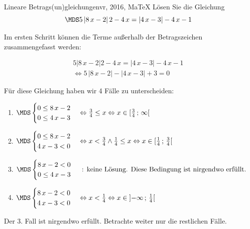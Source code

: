  \providecommand{\MoIl}[1][]{\mbox{}#1]\mathopen{}} 
 \providecommand{\MoIr}[1][]{#1[\mbox{}} 
 \providecommand{\MIntvlSep}{;} 
 \providecommand{\MElSetSep}{\, ; \, } 
 \begin{MAufgabe}{Lineare Betrags(un)gleichungen}{vr, 2016, MaTeX}
L\"osen Sie die Gleichung
$$
 \MDS 5\left| 8\, x - 2 \right|2 - 4\, x=  \left| 4\, x - 3 \right|  - 4\, x - 1
$$  

\ifLsg\MLoesung

Im ersten Schritt k\"onnen die Terme au\ss{}erhalb der Betragszeichen zusammengefasst werden:

\begin{align*} 
 5\left| 8\, x - 2 \right|2 - 4\, x=  \left| 4\, x - 3 \right|  - 4\, x - 1\\ 
\Leftrightarrow5\, \left|8\, x - 2\right| - \left|4\, x - 3\right| + 3= 0 
 \end{align*}

F\"ur diese Gleichung haben wir 4 F\"alle zu unterscheiden: 
\begin{enumerate}
\item $ \MDS 
\begin{cases} 
 0 \leq 8\, x - 2\\ 
0 \leq 4\, x - 3
 \end{cases}
\Leftrightarrow \frac{3}{4} \leq x\Leftrightarrow x \in [ \frac{3}{4} \, \MIntvlSep \, \infty\MoIr $ 
\item $ \MDS 
\begin{cases} 
 0 \leq 8\, x - 2\\ 
4\, x - 3 < 0
 \end{cases}
\Leftrightarrow x < \frac{3}{4} \wedge \frac{1}{4} \leq x\Leftrightarrow x \in [ \frac{1}{4} \, \MIntvlSep \, \frac{3}{4}\MoIr $ 
\item $ \MDS 
\begin{cases} 
 8\, x - 2 < 0\\ 
0 \leq 4\, x - 3
 \end{cases}
 \mbox{ : keine L\"osung. Diese Bedingung ist nirgendwo erf\"ullt.}$ 
\item $ \MDS 
\begin{cases} 
 8\, x - 2 < 0\\ 
4\, x - 3 < 0
 \end{cases}
\Leftrightarrow x < \frac{1}{4}\Leftrightarrow x \in \MoIl  -\infty \, \MIntvlSep \, \frac{1}{4}\MoIr $ 
\end{enumerate} 
Der 3. Fall ist nirgendwo erf\"ullt. Betrachte weiter nur die restlichen F\"alle.
 

\end{MAufgabe}
